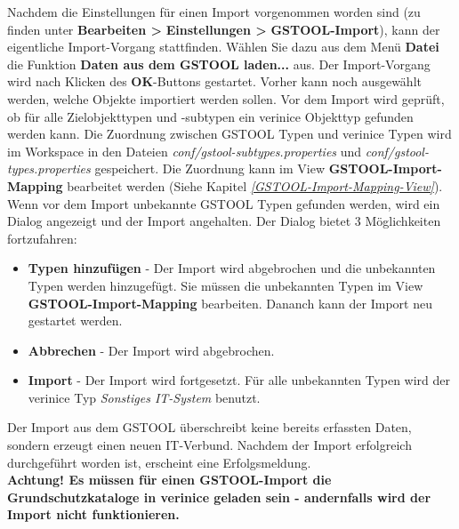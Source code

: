 \documentclass[a4paper,10pt]{book}
\begin{document}
Nachdem die Einstellungen für einen Import vorgenommen worden sind (zu finden unter \textbf{Bearbeiten \textgreater} \textbf{ Einstellungen \textgreater}\textbf{ \textsc{GSTOOL}-Import}),
kann der eigentliche Import-Vorgang stattfinden. Wählen Sie dazu aus dem Menü \textbf{Datei} die Funktion \textbf{Daten aus dem \textsc{GSTOOL} laden...} aus.
Der Import-Vorgang wird nach Klicken des \textbf{OK}-Buttons gestartet. Vorher kann noch ausgewählt werden, welche Objekte importiert werden sollen.
Vor dem Import wird geprüft, ob für alle Zielobjekttypen und -subtypen ein verinice Objekttyp gefunden werden kann. Die Zuordnung zwischen GSTOOL Typen und verinice
Typen wird im Workspace in den Dateien \textit{conf/gstool-subtypes.properties} und \textit{conf/gstool-types.properties} gespeichert. Die Zuordnung kann im View \textbf{GSTOOL-Import-Mapping} bearbeitet werden (Siehe Kapitel {\em \ref{GSTOOL-Import-Mapping-View}}). Wenn vor dem Import unbekannte GSTOOL Typen gefunden werden, wird ein Dialog angezeigt und der Import angehalten. Der Dialog bietet 3 Möglichkeiten fortzufahren:
\begin{itemize}
 \item \textbf{Typen hinzufügen} - Der Import wird abgebrochen und die unbekannten Typen werden hinzugefügt. Sie müssen die unbekannten Typen im View \textbf{GSTOOL-Import-Mapping} bearbeiten. Dananch kann der Import neu gestartet werden.
 \item \textbf{Abbrechen} - Der Import wird abgebrochen.
 \item \textbf{Import} - Der Import wird fortgesetzt. Für alle unbekannten Typen wird der verinice Typ \textit{Sonstiges IT-System} benutzt.
\end{itemize}

Der Import aus dem \textsc{GSTOOL} überschreibt keine bereits erfassten Daten, sondern erzeugt einen neuen IT-Verbund. Nachdem der Import erfolgreich
durchgeführt worden ist, erscheint eine Erfolgsmeldung.
\newline\\
\textbf{Achtung! Es müssen für einen \textsc{GSTOOL}-Import die Grundschutzkataloge in verinice geladen sein - andernfalls wird der Import nicht funktionieren.}
\end{document}
